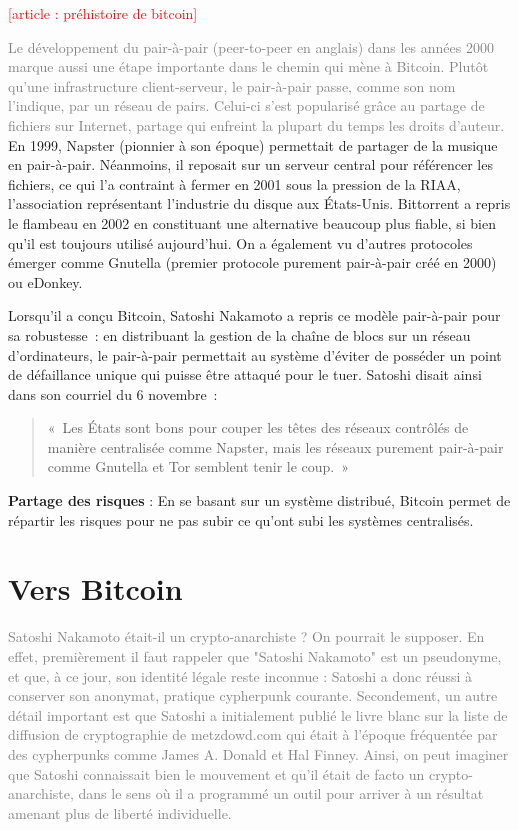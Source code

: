 \textcolor{red}{[article : préhistoire de bitcoin]}

\textcolor{gray}{Le développement du pair-à-pair (peer-to-peer en anglais) dans les années 2000 marque aussi une étape importante dans le chemin qui mène à Bitcoin. Plutôt qu'une infrastructure client-serveur, le pair-à-pair passe, comme son nom l'indique, par un réseau de pairs. Celui-ci s'est popularisé grâce au partage de fichiers sur Internet, partage qui enfreint la plupart du temps les droits d'auteur.} En 1999, Napster (pionnier à son époque) permettait de partager de la musique en pair-à-pair. Néanmoins, il reposait sur un serveur central pour référencer les fichiers, ce qui l'a contraint à fermer en 2001 sous la pression de la RIAA, l'association représentant l'industrie du disque aux États-Unis. Bittorrent a repris le flambeau en 2002 en constituant une alternative beaucoup plus fiable, si bien qu'il est toujours utilisé aujourd'hui. On a également vu d'autres protocoles émerger comme Gnutella (premier protocole purement pair-à-pair créé en 2000) ou eDonkey.

Lorsqu'il a conçu Bitcoin, Satoshi Nakamoto a repris ce modèle pair-à-pair pour sa robustesse~: en distribuant la gestion de la chaîne de blocs sur un réseau d'ordinateurs, le pair-à-pair permettait au système d'éviter de posséder un point de défaillance unique qui puisse être attaqué pour le tuer. Satoshi disait ainsi dans son courriel du 6 novembre~:

\begin{quote}
«~Les États sont bons pour couper les têtes des réseaux contrôlés de manière centralisée comme Napster, mais les réseaux purement pair-à-pair comme Gnutella et Tor semblent tenir le coup.~»
\end{quote}

\textbf{Partage des risques} : En se basant sur un système distribué, Bitcoin permet de répartir les risques pour ne pas subir ce qu'ont subi les systèmes centralisés.

\section{Vers Bitcoin}

\textcolor{gray}{Satoshi Nakamoto était-il un crypto-anarchiste ? On pourrait le supposer. En effet, premièrement il faut rappeler que "Satoshi Nakamoto" est un pseudonyme, et que, à ce jour, son identité légale reste inconnue : Satoshi a donc réussi à conserver son anonymat, pratique cypherpunk courante. Secondement, un autre détail important est que Satoshi a initialement publié le livre blanc sur la liste de diffusion de cryptographie de metzdowd.com qui était à l'époque fréquentée par des cypherpunks comme James A. Donald et Hal Finney. Ainsi, on peut imaginer que Satoshi connaissait bien le mouvement et qu'il était de facto un crypto-anarchiste, dans le sens où il a programmé un outil pour arriver à un résultat amenant plus de liberté individuelle.}




